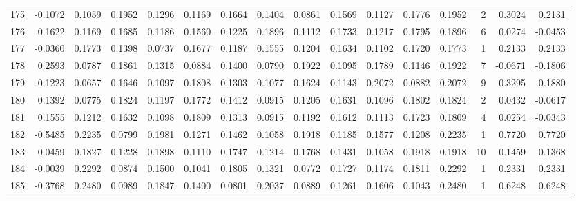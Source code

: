 \begin{tabular}{lrrrrrrrrrrrrrrr}
175 &     -0.1072 &  0.1059 &  0.1952 &  0.1296 &  0.1169 &  0.1664 &  0.1404 &  0.0861 &  0.1569 &  0.1127 &   0.1776 &     0.1952 &      2 &                    0.3024 &                     0.2131 \\
176 &      0.1622 &  0.1169 &  0.1685 &  0.1186 &  0.1560 &  0.1225 &  0.1896 &  0.1112 &  0.1733 &  0.1217 &   0.1795 &     0.1896 &      6 &                    0.0274 &                    -0.0453 \\
177 &     -0.0360 &  0.1773 &  0.1398 &  0.0737 &  0.1677 &  0.1187 &  0.1555 &  0.1204 &  0.1634 &  0.1102 &   0.1720 &     0.1773 &      1 &                    0.2133 &                     0.2133 \\
178 &      0.2593 &  0.0787 &  0.1861 &  0.1315 &  0.0884 &  0.1400 &  0.0790 &  0.1922 &  0.1095 &  0.1789 &   0.1146 &     0.1922 &      7 &                   -0.0671 &                    -0.1806 \\
179 &     -0.1223 &  0.0657 &  0.1646 &  0.1097 &  0.1808 &  0.1303 &  0.1077 &  0.1624 &  0.1143 &  0.2072 &   0.0882 &     0.2072 &      9 &                    0.3295 &                     0.1880 \\
180 &      0.1392 &  0.0775 &  0.1824 &  0.1197 &  0.1772 &  0.1412 &  0.0915 &  0.1205 &  0.1631 &  0.1096 &   0.1802 &     0.1824 &      2 &                    0.0432 &                    -0.0617 \\
181 &      0.1555 &  0.1212 &  0.1632 &  0.1098 &  0.1809 &  0.1313 &  0.0915 &  0.1192 &  0.1612 &  0.1113 &   0.1723 &     0.1809 &      4 &                    0.0254 &                    -0.0343 \\
182 &     -0.5485 &  0.2235 &  0.0799 &  0.1981 &  0.1271 &  0.1462 &  0.1058 &  0.1918 &  0.1185 &  0.1577 &   0.1208 &     0.2235 &      1 &                    0.7720 &                     0.7720 \\
183 &      0.0459 &  0.1827 &  0.1228 &  0.1898 &  0.1110 &  0.1747 &  0.1214 &  0.1768 &  0.1431 &  0.1058 &   0.1918 &     0.1918 &     10 &                    0.1459 &                     0.1368 \\
184 &     -0.0039 &  0.2292 &  0.0874 &  0.1500 &  0.1041 &  0.1805 &  0.1321 &  0.0772 &  0.1727 &  0.1174 &   0.1811 &     0.2292 &      1 &                    0.2331 &                     0.2331 \\
185 &     -0.3768 &  0.2480 &  0.0989 &  0.1847 &  0.1400 &  0.0801 &  0.2037 &  0.0889 &  0.1261 &  0.1606 &   0.1043 &     0.2480 &      1 &                    0.6248 &                     0.6248 \\

\end{tabular}
